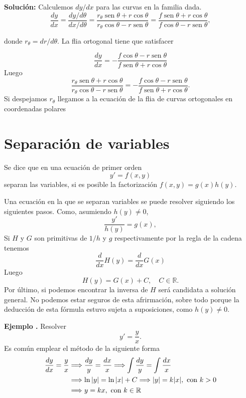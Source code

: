 \documentclass{article}
\newcommand{\rr}{\mathbb{R}}
\DeclareMathOperator{\sen}{sen}
\newcounter{ejemplo_cont}
\newenvironment{ejemplo}{\noindent\textbf{Ejemplo  \arabic{ejemplo_cont}.} }{\addtocounter{ejemplo_cont}{1}}
\begin{document}
\noindent\textbf{Solución:} Calculemos $dy/dx$ para las curvas en la familia dada.
\[\frac{dy}{dx}=\frac{dy/d\theta}{dx/d\theta}=\frac{r_{\theta}\sen\theta+r\cos\theta}{r_{\theta}\cos\theta-r\sen\theta}=\frac{f\sen\theta+r\cos\theta}{f\cos\theta-r\sen\theta},\]

donde $r_{\theta}=dr/d\theta$. La flia ortogonal tiene que satisfacer

\[\frac{dy}{dx}=-\frac{f\cos\theta-r\sen\theta}{f\sen\theta+r\cos\theta}\]
Luego
\[\frac{r_{\theta}\sen\theta+r\cos\theta}{r_{\theta}\cos\theta-r\sen\theta}=-\frac{f\cos\theta-r\sen\theta}{f\sen\theta+r\cos\theta}.\]
Si despejamos $r_{\theta}$ llegamos a la ecuación de la flia de curvas ortogonales en coordenadas polares





\section{Separación de variables}

\begin{definicion} Se dice que en una ecuación de primer orden
 \[y'=f(x,y)\]
 separan las variables, si es posible la factorización $f(x,y)=g(x)h(y)$.
\end{definicion}



Una ecuación  en la que se separan variables se puede resolver siguiendo los siguientes pasos. Como, asumiendo $h(y)\neq 0$,
\[\frac{y'}{h(y)}=g(x),\]
Si $H$ y $G$ son primitivas de $1/h$ y $g$ respectivamente por la regla de la cadena tenemos
\[\frac{d}{dx}H(y)=\frac{d}{dx}G(x)\]
Luego 
\[H(y)=G(x)+C,\quad C\in\rr.\]
Por último, si podemos encontrar la inversa de $H$
será candidata a solución general. No podemos estar seguros de esta afrirmación, sobre todo porque la deducción de esta fórmula estuvo sujeta a suposiciones, como $h(y)\neq 0$.



\begin{ejemplo} Resolver
\[y'=\frac{y}{x}.\]
Es común emplear el método de la siguiente forma
\[\begin{split}
   \frac{dy}{dx}=\frac{y}{x} &\Longrightarrow \frac{dy}{y}=\frac{dx}{x} \Longrightarrow \int \frac{dy}{y}=\int \frac{dx}{x}\\
   &\Longrightarrow\ln|y|=\ln|x|+C \Longrightarrow |y|= k|x|, \hbox{ con }k>0\\
   &\Longrightarrow y= kx, \hbox{ con }k\in\rr
  \end{split}
\]
\end{ejemplo}
\end{document}
